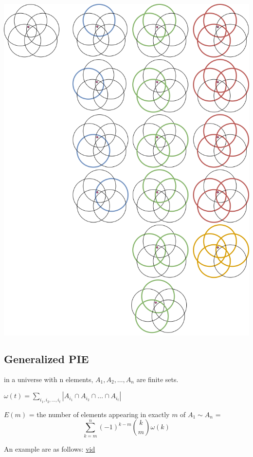 \documentclass[12pt,a4paper]{ctexrep}
\begin{document}
\begin{center}
\includegraphics[scale=0.3]{PIE.png}
\end{center}

\subsection{Generalized PIE}
in a universe with n elements, $A_{1}, A_{2}, \dots , A_{n}$ are finite sets.

$\omega(t) = \sum_{i_{1},i_{2},\dots,i_{t}}|A_{i_{1}} \cap A_{i_{2}} \cap \dots \cap A_{i_{t}}|$

$E(m)$ = the number of elements appearing in exactly $m$ of $A_{1} \sim A_{n}$ = \[\sum_{k=m}^{n} (-1)^{k-m} \binom{k}{m} \omega(k)\]

An example are as follows:  \href{https://www.youtube.com/watch?v=D1T3xy_vtxU}{vid}
\end{document}
